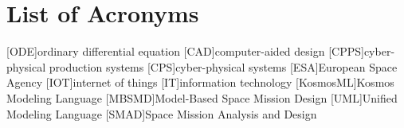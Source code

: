 \chapter*{List of Acronyms}
\begin{acronym}
    [ODE]{ordinary differential equation}
    [CAD]{computer-aided design}
    [CPPS]{cyber-physical production systems}
    [CPS]{cyber-physical systems}
    [ESA]{European Space Agency}
    [IOT]{internet of things}
    [IT]{information technology}
    [KosmosML]{Kosmos Modeling Language}
    [MBSMD]{Model-Based Space Mission Design}
    [UML]{Unified Modeling Language}
    [SMAD]{Space Mission Analysis and Design}
\end{acronym}
